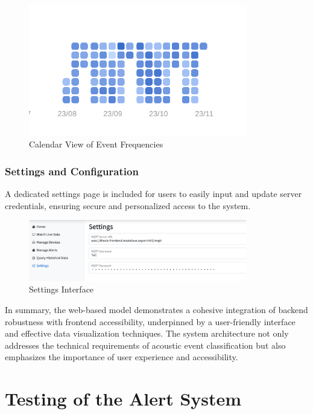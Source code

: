\begin{figure}[htbp]
  \centering
  \includegraphics[width=0.85\textwidth]{Pictures/calendar-weekday-day}
  \caption{\label{fig:calendar-weekday-day}Calendar View of Event Frequencies}
\end{figure}
\subsubsection{Settings and Configuration}
A dedicated settings page is included for users to easily input and update server credentials, ensuring secure and personalized access to the system.

\begin{figure}[htbp]
  \centering
  \includegraphics[width=0.85\textwidth]{Pictures/settings}
  \caption{\label{fig:settings}Settings Interface}
\end{figure}


In summary, the web-based model demonstrates a cohesive integration of backend robustness with frontend accessibility, underpinned by a user-friendly interface and effective data visualization techniques. The system architecture not only addresses the technical requirements of acoustic event classification but also emphasizes the importance of user experience and accessibility.

\section{Testing of the Alert System}
